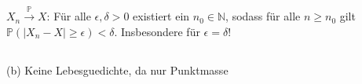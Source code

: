 \documentclass[a4paper]{article}
\begin{document}
\subsection{}

$X_n \xrightarrow{\mathds{P}} X$: Für alle $\epsilon, \delta > 0$ existiert ein $n_0 \in \mathds{N}$, sodass für alle $n \geq n_0$ gilt $\mathds{P}(|X_n - X| \geq \epsilon ) < \delta$. Insbesondere für $\epsilon = \delta$!

\subsection{}

\subsection{}

(b) Keine Lebesguedichte, da nur Punktmasse
\end{document}
